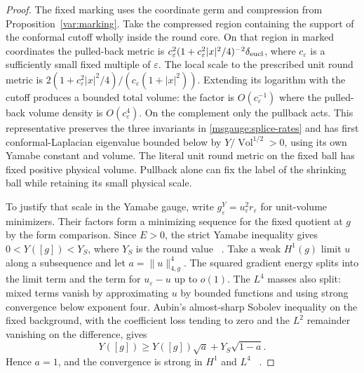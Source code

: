 \documentclass[11pt]{article}
\numberwithin{equation}{section}
\theoremstyle{definition}
\theoremstyle{remark}
\DeclareMathOperator{\Vol}{Vol}
\begin{document}
\begin{proof}
The fixed marking uses the coordinate germ and compression from
Proposition~\ref{var:marking}. Take the compressed region containing
the support of the conformal cutoff wholly inside the round core.
On that region in marked coordinates the pulled-back metric is
\(c_\varepsilon^2(1+c_\varepsilon^2|x|^2/4)^{-2}\delta_{\rm eucl}\),
where \(c_\varepsilon\) is a sufficiently small fixed multiple of
\(\varepsilon\). The local scale to the prescribed unit round
metric is \(2(1+c_\varepsilon^2|x|^2/4)/
(c_\varepsilon(1+|x|^2))\). Extending its logarithm with the
cutoff produces a bounded total volume: the factor is
\(O(c_\varepsilon^{-1})\) where the pulled-back volume density
is \(O(c_\varepsilon^4)\). On the complement only the pullback
acts. This representative preserves the three invariants in
\eqref{msgauge:splice-rates} and has first conformal-Laplacian
eigenvalue bounded below by \(Y/\Vol^{1/2}>0\), using its own
Yamabe constant and volume. The literal unit round metric on
the fixed ball has fixed positive physical volume. Pullback
alone can fix the label of the shrinking ball while retaining its
small physical scale.

To justify that scale in the Yamabe gauge, write
\(g_\varepsilon^Y=u_\varepsilon^2r_\varepsilon\) for unit-volume
minimizers. Their factors form a minimizing sequence for the
fixed quotient at \(g\) by the form comparison. Since \(E>0\),
the strict Yamabe inequality gives \(0<Y([g])<Y_S\), where \(Y_S\)
is the round value%
~\cite[Theorems 2--3]{Schoen1984Yamabe}.
Take a weak \(H^1(g)\) limit \(u\) along a subsequence and let
\(a=\|u\|_{4,g}^4\). The squared gradient energy splits into the
limit term and the term for \(u_\varepsilon-u\) up to \(o(1)\).
The \(L^4\) masses also split: mixed terms vanish by approximating
\(u\) by bounded functions and using strong convergence below
exponent four. Aubin's almost-sharp Sobolev inequality on the
fixed background, with the coefficient loss tending to zero
and the \(L^2\) remainder vanishing on the difference, gives
\[
 Y([g])\ge Y([g])\sqrt a+Y_S\sqrt{1-a}.
\]
Hence \(a=1\), and the convergence is strong in \(H^1\) and
\(L^4\)%
~\cite[\S2, Theorems 2.2--2.3 and \S3]{LeeParker1987Yamabe}.


\end{proof}
\end{document}
